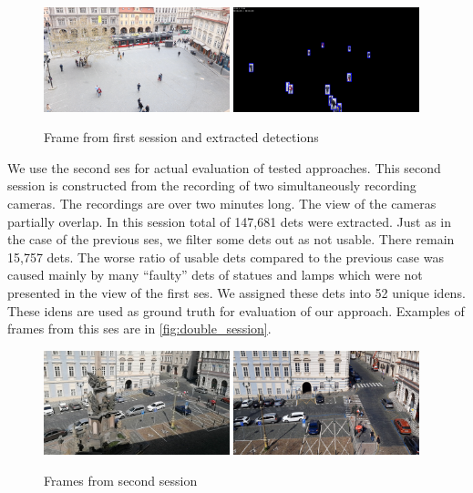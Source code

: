 \begin{figure}
    \centering
    \includegraphics[width=0.48\textwidth]{img/frame_single_session_smaller.png}
    \includegraphics[width=0.48\textwidth]{img/frame_single_session_det_smaller.png}
    \caption{Frame from first session and extracted detections}
    \label{fig:single_session}
\end{figure}

We use the second \gls{ses} for actual evaluation of tested approaches. This second session is constructed from the recording of two simultaneously recording cameras. The recordings are over two minutes long. The view of the cameras partially overlap. In this session total of 147,681 \glspl{det} were extracted. Just as in the case of the previous \gls{ses}, we filter some \glspl{det} out as not usable. There remain 15,757 \glspl{det}. The worse ratio of usable \glspl{det} compared to the previous case was caused mainly by many ``faulty'' \glspl{det} of statues and lamps which were not presented in the view of the first \gls{ses}. We assigned these \glspl{det} into 52 unique \glspl{iden}. These \glspl{iden} are used as ground truth for evaluation of our approach. Examples of frames from this \gls{ses} are in \autoref{fig:double_session}.

\begin{figure}
    \centering
    \includegraphics[width=0.48\textwidth]{img/frame_double_session_1_smaller.png}
    \includegraphics[width=0.48\textwidth]{img/frame_double_session_2_smaller.png}
    \caption{Frames from second session}
    \label{fig:double_session}
\end{figure}

